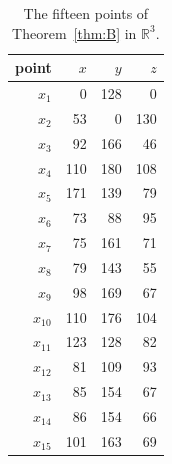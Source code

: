 \begin{table}[tb]
\caption{The fifteen points of Theorem~\ref{thm:B} in $\mathbb{R}^3$.}\label{tab:coordsB}
\begin{ruledtabular}
\begin{tabular}{rrrr}
point & $x$ & $y$ & $z$ \\ \hline
$x_{1}$ & 0 & 128 & 0 \\
$x_{2}$ & 53 & 0 & 130 \\
$x_{3}$ & 92 & 166 & 46 \\
$x_{4}$ & 110 & 180 & 108 \\
$x_{5}$ & 171 & 139 & 79 \\
$x_{6}$ & 73 & 88 & 95 \\
$x_{7}$ & 75 & 161 & 71 \\
$x_{8}$ & 79 & 143 & 55 \\
$x_{9}$ & 98 & 169 & 67 \\
$x_{10}$ & 110 & 176 & 104 \\
$x_{11}$ & 123 & 128 & 82 \\
$x_{12}$ & 81 & 109 & 93 \\
$x_{13}$ & 85 & 154 & 67 \\
$x_{14}$ & 86 & 154 & 66 \\
$x_{15}$ & 101 & 163 & 69 \\
\end{tabular}
\end{ruledtabular}
\end{table}
